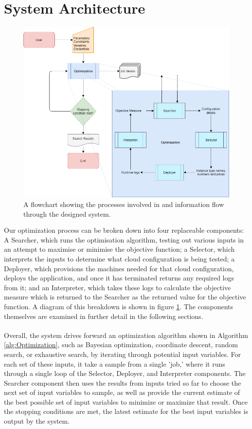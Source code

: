 \documentclass{report}
\begin{document}
\section{System Architecture}
\begin{figure}[!hb]
  \centering
   \includegraphics[scale=0.5]{Design_flowchart}
  \caption{A flowchart showing the processes involved in and information flow through the designed system.}
  \label{fig:design}
\end{figure}
\newpage
Our optimization process can be broken down into four replaceable components: A Searcher, which runs the optimisation algorithm, testing out various inputs in an attempt to maximise or minimise the objective function; a Selector, which interprets the inputs to determine what cloud configuration is being tested; a Deployer, which provisions the machines needed for that cloud configuration, deploys the application, and once it has terminated returns any required logs from it; and an Interpreter, which takes these logs to calculate the objective measure which is returned to the Searcher as the returned value for the objective function. A diagram of this breakdown is shown in figure \ref{fig:design}. The components themselves are examined in further detail in the following sections.
 
\paragraph{}
Overall, the system drives forward an optimization algorithm shown in Algorithm \ref{alg:Optimization}, such as Bayesian optimization, coordinate descent, random search, or exhaustive search, by iterating through potential input variables. For each set of these inputs, it take a sample from a single 'job,' where it runs through a single loop of the Selector, Deployer, and Interpreter components. The Searcher component then uses the results from inputs tried so far to choose the next set of input variables to sample, as well as provide the current estimate of the best possible set of input variables to minimize or maximize that result. Once the stopping conditions are met, the latest estimate for the best input variables is output by the system.
\end{document}
